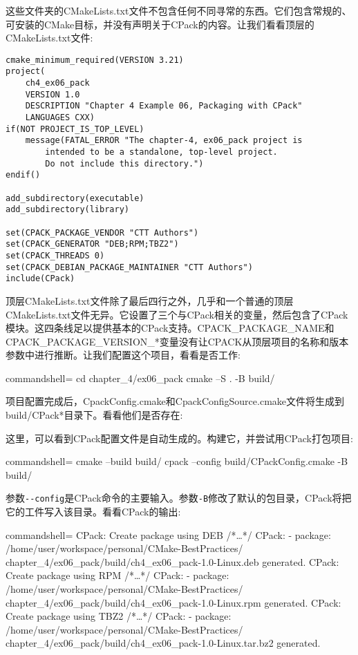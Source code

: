 这些文件夹的CMakeLists.txt文件不包含任何不同寻常的东西。它们包含常规的、可安装的CMake目标，并没有声明关于CPack的内容。让我们看看顶层的CMakeLists.txt文件:

\begin{lstlisting}[style=styleCMake]
cmake_minimum_required(VERSION 3.21)
project(
	ch4_ex06_pack
	VERSION 1.0
	DESCRIPTION "Chapter 4 Example 06, Packaging with CPack"
	LANGUAGES CXX)
if(NOT PROJECT_IS_TOP_LEVEL)
	message(FATAL_ERROR "The chapter-4, ex06_pack project is
		intended to be a standalone, top-level project.
		Do not include this directory.")
endif()

add_subdirectory(executable)
add_subdirectory(library)

set(CPACK_PACKAGE_VENDOR "CTT Authors")
set(CPACK_GENERATOR "DEB;RPM;TBZ2")
set(CPACK_THREADS 0)
set(CPACK_DEBIAN_PACKAGE_MAINTAINER "CTT Authors")
include(CPack)
\end{lstlisting}

顶层CMakeLists.txt文件除了最后四行之外，几乎和一个普通的顶层CMakeLists.txt文件无异。它设置了三个与CPack相关的变量，然后包含了CPack模块。这四条线足以提供基本的CPack支持。CPACK\_PACKAGE\_NAME和CPACK\_PACKAGE\_VERSION\_*变量没有让CPACK从顶层项目的名称和版本参数中进行推断。让我们配置这个项目，看看是否工作:

\begin{tcblisting}{commandshell={}}
cd chapter_4/ex06_pack
cmake –S . -B build/
\end{tcblisting}

项目配置完成后，CpackConfig.cmake和CpackConfigSource.cmake文件将生成到build/CPack*目录下。看看他们是否存在:


这里，可以看到CPack配置文件是自动生成的。构建它，并尝试用CPack打包项目:

\begin{tcblisting}{commandshell={}}
cmake --build build/
cpack --config build/CPackConfig.cmake -B build/
\end{tcblisting}

参数\texttt{-{}-config}是CPack命令的主要输入。参数\texttt{-B}修改了默认的包目录，CPack将把它的工件写入该目录。看看CPack的输出:

\begin{tcblisting}{commandshell={}}
CPack: Create package using DEB
/*…*/
CPack: - package: /home/user/workspace/personal/CMake-BestPractices/
chapter_4/ex06_pack/build/ch4_ex06_pack-1.0-Linux.deb
generated.
CPack: Create package using RPM
/*…*/
CPack: - package: /home/user/workspace/personal/CMake-BestPractices/
chapter_4/ex06_pack/build/ch4_ex06_pack-1.0-Linux.rpm
generated.
CPack: Create package using TBZ2
/*…*/
CPack: - package: /home/user/workspace/personal/CMake-BestPractices/
chapter_4/ex06_pack/build/ch4_ex06_pack-1.0-Linux.tar.bz2 
generated.
\end{tcblisting}

